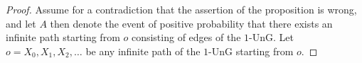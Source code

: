 \documentclass[oneside]{amsart}
\theoremstyle{definition}
\newcommand{\1}{\mathbbm{1}}
\newcommand{\0}{\mathbf{o}}
\numberwithin{equation}{section}
\begin{document}
\begin{proof}
Assume for a contradiction that the assertion of the proposition is wrong, and let $A$ then denote the event of positive probability that there exists an infinite path starting from $o$ consisting of edges of the $1$-UnG. %
Let $o=X_0,X_1,X_2,\ldots$ be any infinite path of the $1$-UnG starting from $o$.

\end{proof}
\end{document}
